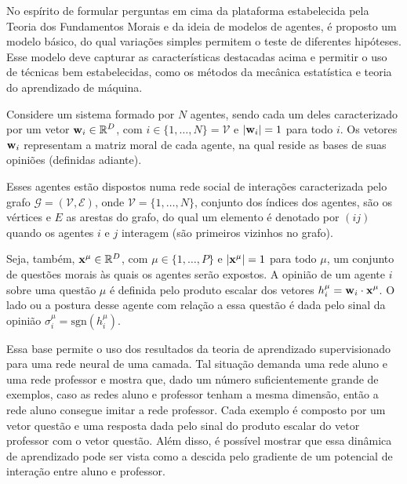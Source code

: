 \documentclass[11pt]{article}
\begin{document}
\newcommand{\ins}[1]{\ensuremath{\displaystyle%
    \left[#1\right]}}

\newcommand{\inc}[1]{\ensuremath{\displaystyle%
    \left{#1\right}}}

No espírito de formular perguntas em cima da plataforma estabelecida pela Teoria
dos Fundamentos Morais e da ideia de modelos de agentes, é proposto um modelo
básico, do qual variações simples permitem o teste de diferentes hipóteses. Esse
modelo deve capturar as características destacadas acima e permitir o uso de
técnicas bem estabelecidas, como os métodos da mecânica estatística e teoria do
aprendizado de máquina.

Considere um sistema formado por $N$ agentes, sendo cada um deles caracterizado
por um vetor $\displaystyle \bold{w}_{i}  \in \mathbb{R}^D$, com $i \in \{1,\ldots,N\} = \mathcal{V}$
e $|\displaystyle \bold{w}_{i} |=1$ para todo $i$.
Os vetores $\displaystyle \bold{w}_{i} $ representam a matriz moral de cada agente, na qual reside as
bases de suas opiniões (definidas adiante).

Esses agentes estão dispostos numa rede social de interações
caracterizada pelo grafo $\mathcal{G}=(\mathcal{V},\mathcal{E})$, onde 
$\mathcal{V} = \{1,\ldots,N\}$, conjunto dos índices dos agentes, são os 
vértices e $E$ as arestas do grafo, do qual um elemento é denotado por
$(ij)$ quando os agentes $i$ e $j$ interagem (são primeiros vizinhos no grafo).

Seja, também, $\bold{x}^{\mu} \in \mathbb{R}^D$, com $\mu \in \{1,\ldots,P\}$
e $|\bold{x}^{\mu}|=1$ para todo $\mu$, um conjunto de questões morais às quais
os agentes serão expostos.
A opinião de um agente $i$ sobre uma questão $\mu$ é definida pelo produto
escalar dos vetores $h_i^{\mu}=\displaystyle { \ensuremath{\displaystyle \bold{w}_{i} } } \cdot {\bold{x}^{\mu}} $.
O lado ou a postura desse agente com relação a essa questão é dada pelo sinal
da opinião $\sigma_i^{\mu}=\mathrm{sgn}(h_i^{\mu})$.

Essa base permite o uso dos resultados da teoria de aprendizado supervisionado
para uma rede neural de uma camada. Tal situação demanda uma rede aluno e uma
rede professor e mostra que, dado um número suficientemente grande de exemplos,
caso as redes aluno e professor tenham a mesma dimensão, então a rede aluno
consegue imitar a rede professor.
Cada exemplo é composto por um vetor questão e uma resposta dada pelo sinal do
produto escalar do vetor professor com o vetor questão.
Além disso, é possível mostrar \cite{Engel} que essa dinâmica de
aprendizado pode ser vista como a descida pelo gradiente de um potencial de
interação entre aluno e professor.
\end{document}
